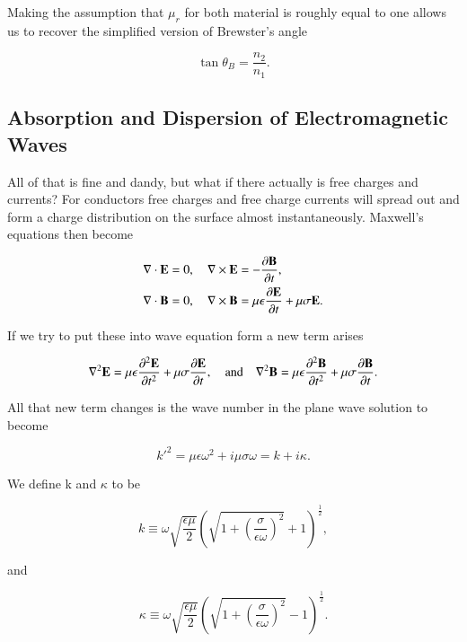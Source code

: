 \documentclass[preprint, review,12pt]{elsarticle}
\def\x{\times}
\def\.{\cdot}
\def\b{\textbf}
\def\={\equiv}
\def\div{\nabla \.}
\def\curl{\nabla \x}
\def\lap{\nabla^2}
\def\and{\quad \text{and} \quad}
\def\9{\left(}
\def\0{\right)}
\newcommand{\pd}[2]{\frac{\partial #1 }{\partial #2}}
\newcommand{\pds}[2]{\frac{\partial^2 #1 }{\partial {#2}^2}}
\begin{document}
Making the assumption that $\mu_r$ for both material is roughly equal to one allows us to recover the simplified version of Brewster's angle

\begin{equation}
    \tan\theta_B = \frac{n_2}{n_1}.
\end{equation}

\subsection{Absorption and Dispersion of Electromagnetic Waves}

 All of that is fine and dandy, but what if there actually is free charges and currents? For conductors free charges and free charge currents will spread out and form a charge distribution on the surface almost instantaneously. Maxwell's equations then become
 
\begin{equation}
\begin{split}
    & \div \b E = 0, \quad \curl \b E = -\pd{\b B}{t}, \\
    & \div \b B = 0, \quad \curl \b B = \mu \epsilon \pd{\b E}{t} + \mu \sigma \b E.
\end{split}
\end{equation}

If we try to put these into wave equation form a new term arises

\begin{equation}
    \lap \b E = \mu \epsilon \pds{\b E}{t} + \mu \sigma \pd{\b E}{t}, \and \lap \b B = \mu \epsilon \pds{\b B}{t} + \mu \sigma \pd{\b B}{t}.
\end{equation}

All that new term changes is the wave number in the plane wave solution to become 

\begin{equation}
    {k'}^2 = \mu \epsilon\omega^2 + i \mu \sigma \omega = k + i\kappa.
\end{equation}

We define k and $\kappa$ to be

\begin{equation}
     k \= \omega\sqrt{\frac{\epsilon\mu}{2}} \9 \sqrt{1 + \9 \frac{\sigma}{\epsilon\omega} \0^2} + 1 \0^{\frac{1}{2}},
\end{equation}

and

\begin{equation}
    \kappa \= \omega\sqrt{\frac{\epsilon\mu}{2}} \9 \sqrt{1 + \9 \frac{\sigma}{\epsilon\omega} \0^2} - 1 \0^{\frac{1}{2}}.
\end{equation}
\end{document}
